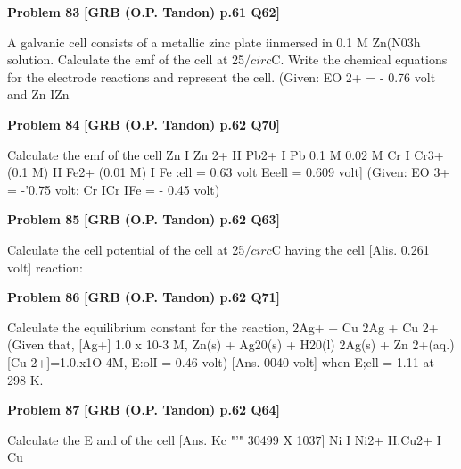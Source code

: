 \begin{problembox}
\textbf{Problem 83} \hfill \textbf{[GRB (O.P. Tandon) p.61 Q62]}
\label{q:ext-grb_all_questions-83}

A galvanic cell consists of a metallic zinc plate iinmersed in 
0.1 M Zn(N03h solution. Calculate the emf of the cell at 
25$/circ$C. Write the chemical equations for the electrode reactions 
and represent the cell. (Given: EO 2+ 
= - 0.76 volt and 
Zn 
IZn
\end{problembox}

\begin{problembox}
\textbf{Problem 84} \hfill \textbf{[GRB (O.P. Tandon) p.62 Q70]}
\label{q:ext-grb_all_questions-84}

Calculate the emf of the cell 
Zn I Zn 2+ II Pb2+ I Pb 
0.1 M 
0.02 M 
Cr I Cr3+ (0.1 M) II Fe2+ (0.01 M) I Fe 
 :ell = 0.63 volt 
Eeell = 0.609 volt] 
(Given: EO 3+ 
= -'0.75 volt; 
Cr 
ICr 
IFe = - 0.45 volt)
\end{problembox}

\begin{problembox}
\textbf{Problem 85} \hfill \textbf{[GRB (O.P. Tandon) p.62 Q63]}
\label{q:ext-grb_all_questions-85}

Calculate the cell potential of the cell at 25$/circ$C having the cell 
[Alis. 
0.261 volt] 
reaction:
\end{problembox}

\begin{problembox}
\textbf{Problem 86} \hfill \textbf{[GRB (O.P. Tandon) p.62 Q71]}
\label{q:ext-grb_all_questions-86}

Calculate the equilibrium constant for the reaction, 
2Ag+ + Cu 
2Ag + Cu 2+ 
(Given that, 
[Ag+] 
1.0 x 10-3 M, 
Zn(s) + Ag20(s) + H20(l) 
2Ag(s) + Zn 2+(aq.) 
[Cu 2+]=1.0.x1O-4M, E:olI = 0.46 volt) 
[Ans. 
0040 volt] 
when E;ell = 1.11 at 298 K.
\end{problembox}

\begin{problembox}
\textbf{Problem 87} \hfill \textbf{[GRB (O.P. Tandon) p.62 Q64]}
\label{q:ext-grb_all_questions-87}

Calculate the E and 
of the cell 
[Ans. Kc "'" 30499 X 1037] 
Ni I Ni2+ II.Cu2+ I Cu
\end{problembox}

